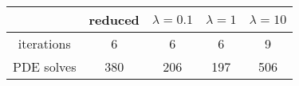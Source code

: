 \begin{tabular}{ccccc}
& reduced & $\lambda = 0.1$ & $\lambda = 1$ & $\lambda = 10$ \\
\hline
iterations & 6 & 6 & 6 & 9 \\
PDE solves & 380 & 206 & 197 & 506 \\
\hline
\end{tabular}
